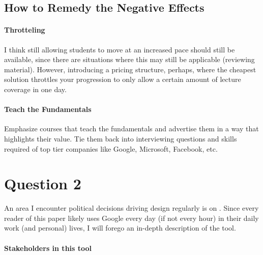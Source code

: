 \subsection{How to Remedy the Negative Effects}

\paragraph{Throtteling}
I think still allowing students to move at an increased pace should still be available, since there are situations where this may still be applicable (reviewing material). However, introducing a pricing structure, perhaps, where the cheapest solution throttles your progression to only allow a certain amount of lecture coverage in one day.

\paragraph{Teach the Fundamentals}
Emphasize courses that teach the fundamentals and advertise them in a way that highlights their value. Tie them back into interviewing questions and skills required of top tier companies like Google, Microsoft, Facebook, etc.

\section{Question 2}

An area I encounter political decisions driving design regularly is on . Since every reader of this paper likely uses Google every day (if not every hour) in their daily work (and personal) lives, I will forego an in-depth description of the tool.

\paragraph{Stakeholders in this tool}

